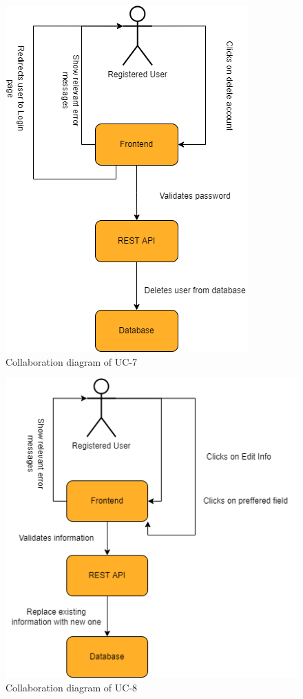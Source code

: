 \begin{figure}[H]
    \centering
    \includegraphics[scale=0.5]{./diagrams/collaboration/cd-7.png}
    \caption{Collaboration diagram of UC-7}
    \label{fig:cd-07}
    
\end{figure}


\begin{figure}[H]
    \centering
    \includegraphics[scale=0.5]{./diagrams/collaboration/cd-8.png}
    \caption{Collaboration diagram of UC-8}
    \label{fig:cd-08}
    
\end{figure}


